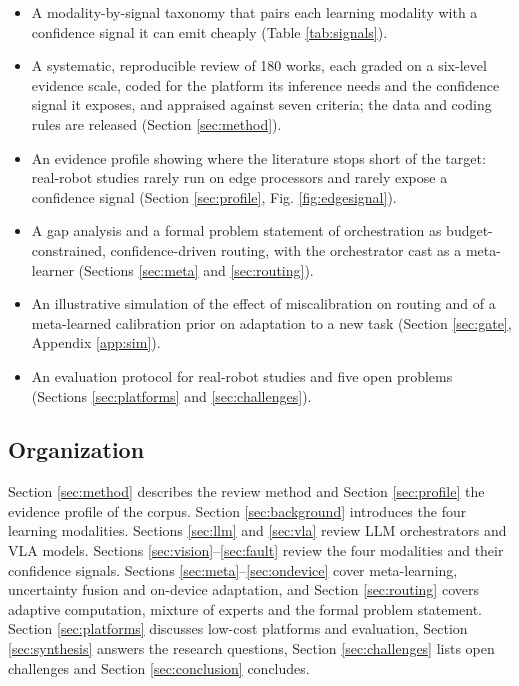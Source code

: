\documentclass[journal]{IEEEtran}
\begin{document}
\begin{itemize}
\item A modality-by-signal taxonomy that pairs each learning modality with a confidence signal it can emit cheaply (Table \ref{tab:signals}).
\item A systematic, reproducible review of 180 works, each graded on a six-level evidence scale, coded for the platform its inference needs and the confidence signal it exposes, and appraised against seven criteria; the data and coding rules are released (Section \ref{sec:method}).
\item An evidence profile showing where the literature stops short of the target: real-robot studies rarely run on edge processors and rarely expose a confidence signal (Section \ref{sec:profile}, Fig. \ref{fig:edgesignal}).
\item A gap analysis and a formal problem statement of orchestration as budget-constrained, confidence-driven routing, with the orchestrator cast as a meta-learner (Sections \ref{sec:meta} and \ref{sec:routing}).
\item An illustrative simulation of the effect of miscalibration on routing and of a meta-learned calibration prior on adaptation to a new task (Section \ref{sec:gate}, Appendix \ref{app:sim}).
\item An evaluation protocol for real-robot studies and five open problems (Sections \ref{sec:platforms} and \ref{sec:challenges}).
\end{itemize}


\subsection{Organization}\label{sec:organization}
Section \ref{sec:method} describes the review method and Section \ref{sec:profile} the evidence profile of the corpus. Section \ref{sec:background} introduces the four learning modalities. Sections \ref{sec:llm} and \ref{sec:vla} review LLM orchestrators and VLA models. Sections \ref{sec:vision}--\ref{sec:fault} review the four modalities and their confidence signals. Sections \ref{sec:meta}--\ref{sec:ondevice} cover meta-learning, uncertainty fusion and on-device adaptation, and Section \ref{sec:routing} covers adaptive computation, mixture of experts and the formal problem statement. Section \ref{sec:platforms} discusses low-cost platforms and evaluation, Section \ref{sec:synthesis} answers the research questions, Section \ref{sec:challenges} lists open challenges and Section \ref{sec:conclusion} concludes.
\end{document}
